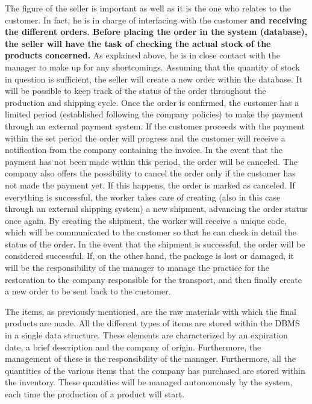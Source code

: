 The figure of the seller is important as well as it is the one who relates to the customer. In fact, he is in charge of interfacing with the customer \textbf{and receiving the different orders. Before placing the order in the system (database), the seller will have the task of checking the actual stock of the products concerned.} As explained above, he is in close contact with the manager to make up for any shortcomings. Assuming that the quantity of stock in question is sufficient, the seller will create a new order within the database. It will be possible to keep track of the status of the order throughout the production and shipping cycle. Once the order is confirmed, the customer has a limited period (established following the company policies) to make the payment through an external payment system. If the customer proceeds with the payment within the set period the order will progress and the customer will receive a notification from the company containing the invoice. In the event that the payment has not been made within this period, the order will be canceled. The company also offers the possibility to cancel the order only if the customer has not made the payment yet. If this happens, the order is marked as canceled. If everything is successful, the worker takes care of creating (also in this case through an external shipping system) a new shipment, advancing the order status once again. By creating the shipment, the worker will receive a unique code, which will be communicated to the customer so that he can check in detail the status of the order. In the event that the shipment is successful, the order will be considered successful. If, on the other hand, the package is lost or damaged, it will be the responsibility of the manager to manage the practice for the restoration to the company responsible for the transport, and then finally create a new order to be sent back to the customer.

The items, as previously mentioned, are the raw materials with which the final products are made. All the different types of items are stored within the DBMS in a single data structure. These elements are characterized by an expiration date, a brief description and the company of origin. Furthermore, the management of these is the responsibility of the manager. Furthermore, all the quantities of the various items that the company has purchased are stored within the inventory. These quantities will be managed autonomously by the system, each time the production of a product will start.

